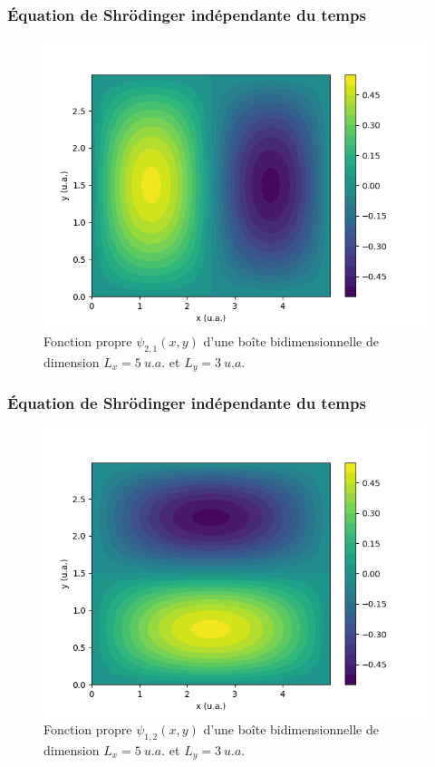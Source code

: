 \documentclass[aspectratio=169]{beamer}
\begin{document}
\begin{frame}
\frametitle{Équation de Shrödinger indépendante du temps}
\begin{figure}[h]
\includegraphics[scale=0.5]{fct_propre2d_21}
\caption{Fonction propre $\psi_{2,1}(x,y)$ d'une boîte bidimensionnelle de dimension $L_x=5\ u.a.$ et $L_y=3\ u.a.$}
\end{figure}
\end{frame}


\begin{frame}
\frametitle{Équation de Shrödinger indépendante du temps}
\begin{figure}[h]
\includegraphics[scale=0.5]{fct_propre2d_12}
\caption{Fonction propre $\psi_{1,2}(x,y)$ d'une boîte bidimensionnelle de dimension $L_x=5\ u.a.$ et $L_y=3\ u.a.$}
\end{figure}
\end{frame}
\end{document}
